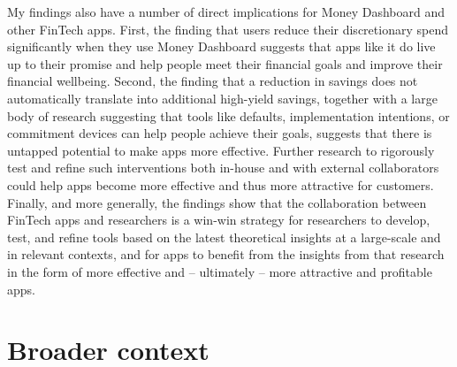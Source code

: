 My findings also have a number of direct implications for Money Dashboard and
other FinTech apps. First, the finding that users reduce their discretionary
spend significantly when they use Money Dashboard suggests that apps like it do
live up to their promise and help people meet their financial goals and improve
their financial wellbeing. Second, the finding that a reduction in savings does
not automatically translate into additional high-yield savings, together with a
large body of research suggesting that tools like defaults, implementation
intentions, or commitment devices can help people achieve their goals, suggests
that there is untapped potential to make apps more effective. Further research
to rigorously test and refine such interventions both in-house and with
external collaborators could help apps become more effective and thus more
attractive for customers. Finally, and more generally, the findings show that
the collaboration between FinTech apps and researchers is a win-win strategy
for researchers to develop, test, and refine tools based on the latest
theoretical insights at a large-scale and in relevant contexts, and for
apps to benefit from the insights from that research in the form of more
effective and -- ultimately -- more attractive and profitable apps. 

\section{Broader context}

